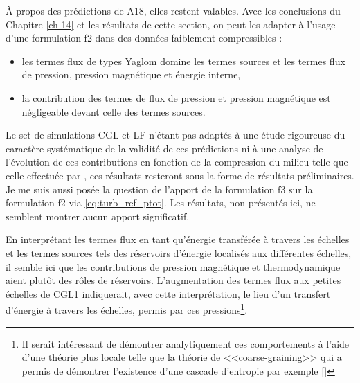 À propos des prédictions de A18, elles restent valables. Avec les conclusions du Chapitre \ref{ch-14} et les résultats de cette section, on peut les adapter à l'usage d'une formulation f2 dans des données faiblement compressibles : 
\begin{itemize}
    \item les termes flux de types Yaglom domine les termes sources et les termes flux de pression, pression magnétique et énergie interne,
    \item la contribution des termes de flux de pression et pression magnétique est négligeable devant celle des termes sources.
\end{itemize}
Le set de simulations CGL et LF n'étant pas adaptés à une étude rigoureuse du caractère systématique de la validité de ces prédictions ni à une analyse de l'évolution de ces contributions en fonction de la compression du milieu telle que celle effectuée par \cite{andres_energy_2018}, ces résultats resteront sous la forme de résultats préliminaires. Je me suis aussi posée la question de l'apport de la formulation f3 sur la formulation f2 via \eqref{eq:turb_ref_ptot}. Les résultats, non présentés ici, ne semblent montrer aucun apport significatif.

En interprétant les termes flux en tant qu'énergie transférée à travers les échelles et les termes sources tels des réservoirs d'énergie localisés aux différentes échelles, il semble ici que les contributions de pression magnétique et thermodynamique aient plutôt des rôles de réservoirs. L'augmentation des termes flux aux petites échelles de CGL1 indiquerait, avec cette interprétation, le lieu d'un transfert d'énergie à travers les échelles, permis par ces pressions\footnote{Il serait intéressant de démontrer analytiquement ces comportements à l'aide d'une théorie plus locale telle que la théorie de <<coarse-graining>> qui a permis de démontrer l'existence d'une cascade d'entropie par exemple [\cite{eyink_cascades_2018}]}.



